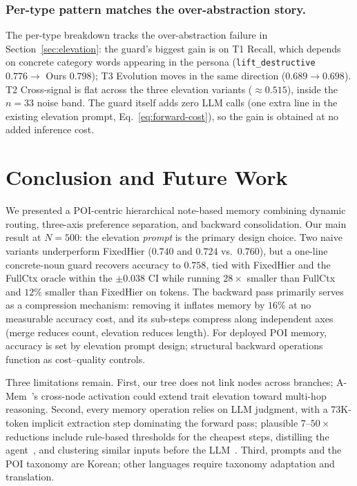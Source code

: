 \documentclass[sigconf,review,anonymous]{acmart}
\begin{document}
\subsubsection{Per-type pattern matches the over-abstraction story.}
The per-type breakdown tracks the over-abstraction failure in Section~\ref{sec:elevation}: the guard's biggest gain is on T1 Recall, which depends on concrete category words appearing in the persona (\texttt{lift\_destructive} \(0.776 \to\) Ours \(0.798\)); T3 Evolution moves in the same direction (\(0.689 \to 0.698\)). T2 Cross-signal is flat across the three elevation variants (\(\approx 0.515\)), inside the \(n{=}33\) noise band. The guard itself adds zero LLM calls (one extra line in the existing elevation prompt, Eq.~\eqref{eq:forward-cost}), so the gain is obtained at no added inference cost.

\section{Conclusion and Future Work}
\label{sec:limitations}

We presented a POI-centric hierarchical note-based memory combining dynamic routing, three-axis preference separation, and backward consolidation. Our main result at \(N{=}500\): the elevation \emph{prompt} is the primary design choice. Two naive variants underperform FixedHier (\(0.740\) and \(0.724\) vs.\ \(0.760\)), but a one-line concrete-noun guard recovers accuracy to \(0.758\), tied with FixedHier and the FullCtx oracle within the \(\pm 0.038\) CI while running \(28\times\) smaller than FullCtx and \(12\%\) smaller than FixedHier on tokens. The backward pass primarily serves as a compression mechanism: removing it inflates memory by \(16\%\) at no measurable accuracy cost, and its sub-steps compress along independent axes (merge reduces count, elevation reduces length). For deployed POI memory, accuracy is set by elevation prompt design; structural backward operations function as cost--quality controls.

Three limitations remain. First, our tree does not link nodes across branches; A-Mem~\cite{amem}'s cross-node activation could extend trait elevation toward multi-hop reasoning. Second, every memory operation relies on LLM judgment, with a 73K-token implicit extraction step dominating the forward pass; plausible \(7\)--\(50\times\) reductions include rule-based thresholds for the cheapest steps, distilling the agent~\cite{personamem-v2}, and clustering similar inputs before the LLM~\cite{personax}. Third, prompts and the POI taxonomy are Korean; other languages require taxonomy adaptation and translation.
\end{document}
